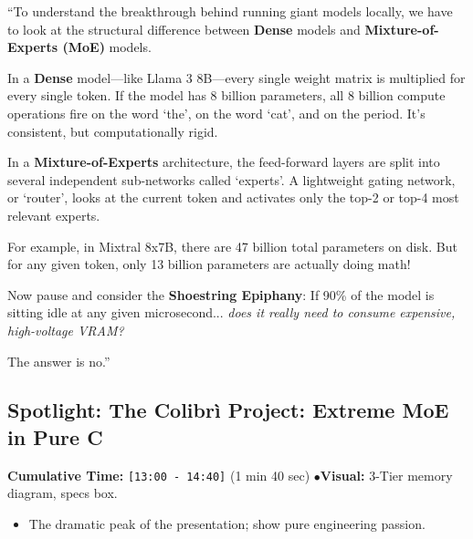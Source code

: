 \documentclass[11pt,a4paper]{article}
\begin{document}
\begin{speechbox}
``To understand the breakthrough behind running giant models locally, we have to look at the structural difference between \textbf{Dense} models and \textbf{Mixture-of-Experts (MoE)} models.

In a \textbf{Dense} model---like Llama 3 8B---every single weight matrix is multiplied for every single token. If the model has 8 billion parameters, all 8 billion compute operations fire on the word `the', on the word `cat', and on the period. It's consistent, but computationally rigid.

In a \textbf{Mixture-of-Experts} architecture, the feed-forward layers are split into several independent sub-networks called `experts'. A lightweight gating network, or `router', looks at the current token and activates only the top-2 or top-4 most relevant experts.

For example, in Mixtral 8x7B, there are 47 billion total parameters on disk. But for any given token, only 13 billion parameters are actually doing math!

Now pause and consider the \textbf{Shoestring Epiphany}:
If 90\% of the model is sitting idle at any given microsecond... \textit{does it really need to consume expensive, high-voltage VRAM?}

The answer is no.''
\end{speechbox}

\subsection{Spotlight: The Colibr\`i Project: Extreme MoE in Pure C}
\begin{directionbox}
    \textbf{Cumulative Time:} \texttt{[13:00 - 14:40]} (1 min 40 sec) \quad$\bullet$\quad \textbf{Visual:} 3-Tier memory diagram, specs box.
    \begin{itemize}
        \item The dramatic peak of the presentation; show pure engineering passion.
    \end{itemize}
\end{directionbox}
\end{document}
